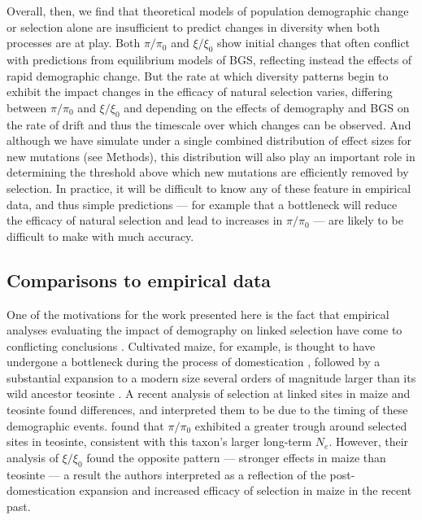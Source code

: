 \documentclass[9pt,twocolumn,twoside]{rilabRxiv}
\begin{document}
Overall, then, we find that theoretical models of population demographic change or selection alone are insufficient to predict changes in diversity when both processes are at play. 
Both $\pi/\pi_0$ and $\xi/\xi_0$ show initial changes that often conflict with predictions from equilibrium models of BGS, reflecting instead the effects of rapid demographic change.
But the rate at which diversity patterns begin to exhibit the impact changes in the efficacy of natural selection varies, differing between $\pi/\pi_0$ and $\xi/\xi_0$ and depending on the effects of demography and BGS on the rate of drift and thus the timescale over which changes can be observed.
And although we have simulate under a single combined distribution of effect sizes for new mutations (see Methods), this distribution will also play an important role in determining the threshold above which new mutations are efficiently removed by selection.
In practice, it will be difficult to know any of these feature in empirical data, and thus simple predictions --- for example that a bottleneck will reduce the efficacy of natural selection and lead to increases in $\pi/\pi_0$ --- are likely to be difficult to make with much accuracy.

\subsection{Comparisons to empirical data}

One of the motivations for the work presented here is the fact that empirical analyses evaluating the impact of demography on linked selection have come to conflicting conclusions \citep{torres2018human, beissinger2016recent}.
Cultivated maize, for example, is thought to have undergone a bottleneck during the process of domestication \citep{eyre1998investigation,tenaillon2004selection,wright2005effects}, followed by a substantial expansion to a modern size several orders of magnitude larger than its wild ancestor teosinte \citep{beissinger2016recent, bellon2018evolutionary}.
A recent analysis of selection at linked sites in  maize and teosinte found differences, and interpreted them to be due to the timing of these demographic events.
\citet{beissinger2016recent} found that $\pi/\pi_0$ exhibited a greater trough around selected sites in teosinte, consistent with this taxon's larger long-term $N_e$.
However, their analysis of $\xi/\xi_0$ found the opposite pattern --- stronger effects in maize than teosinte --- a result the authors interpreted as a reflection of the post-domestication expansion and increased efficacy of selection in maize in the recent past.
\end{document}
